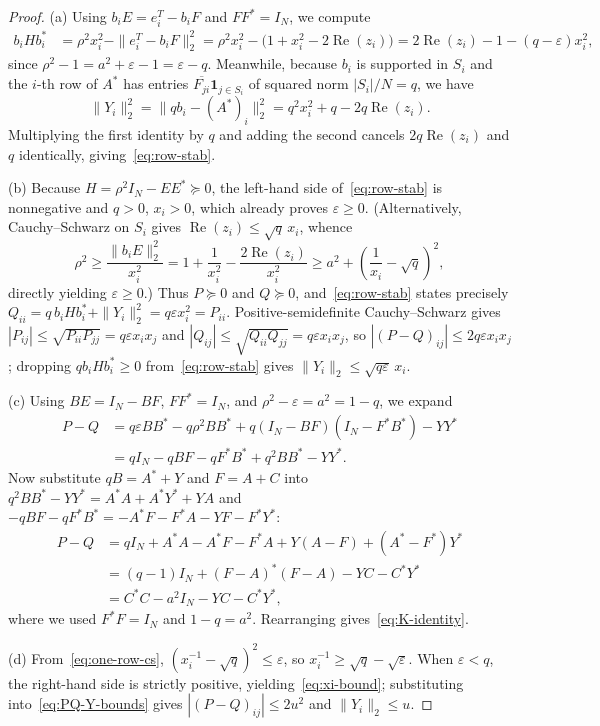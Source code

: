 \documentclass[11pt,reqno]{amsart}
\numberwithin{equation}{section}
\theoremstyle{definition}
\theoremstyle{remark}
\begin{document}
\begin{proof}
(a) Using $b_i E = e_i^T - b_i F$ and $FF^*=I_N$, we compute
\begin{align*}
b_i H b_i^*
&= \rho^2 x_i^2 - \|e_i^T - b_i F\|_2^2
= \rho^2 x_i^2 - \bigl(1 + x_i^2 - 2\operatorname{Re}(z_i)\bigr)
= 2\operatorname{Re}(z_i) - 1 - (q - \varepsilon)x_i^2,
\end{align*}
since $\rho^2 - 1 = a^2 + \varepsilon - 1 = \varepsilon - q$. Meanwhile, because $b_i$ is supported in $S_i$ and the $i$-th row of $A^*$ has entries $\overline{F_{ji}}\mathbf{1}_{j\in S_i}$ of squared norm $|S_i|/N = q$, we have
\[
\|Y_i\|_2^2 = \|q b_i - (A^*)_i\|_2^2 = q^2 x_i^2 + q - 2q\operatorname{Re}(z_i).
\]
Multiplying the first identity by $q$ and adding the second cancels $2q\operatorname{Re}(z_i)$ and $q$ identically, giving~\eqref{eq:row-stab}.

(b) Because $H=\rho^2 I_N - EE^* \succeq 0$, the left-hand side of~\eqref{eq:row-stab} is nonnegative and $q>0$, $x_i>0$, which already proves $\varepsilon\ge 0$. (Alternatively, Cauchy--Schwarz on $S_i$ gives $\operatorname{Re}(z_i)\le \sqrt{q}\,x_i$, whence
\begin{equation}
\label{eq:one-row-cs}
\rho^2 \ge \frac{\|b_i E\|_2^2}{x_i^2}
= 1 + \frac{1}{x_i^2} - \frac{2\operatorname{Re}(z_i)}{x_i^2}
\ge a^2 + \left(\frac{1}{x_i} - \sqrt{q}\right)^2,
\end{equation}
directly yielding $\varepsilon\ge 0$.) Thus $P\succeq 0$ and $Q\succeq 0$, and~\eqref{eq:row-stab} states precisely $Q_{ii} = q\,b_i H b_i^* + \|Y_i\|_2^2 = q\varepsilon x_i^2 = P_{ii}$. Positive-semidefinite Cauchy--Schwarz gives $|P_{ij}|\le\sqrt{P_{ii}P_{jj}}=q\varepsilon x_i x_j$ and $|Q_{ij}|\le\sqrt{Q_{ii}Q_{jj}}=q\varepsilon x_i x_j$, so $|(P-Q)_{ij}|\le 2q\varepsilon x_i x_j$; dropping $q b_i H b_i^*\ge 0$ from~\eqref{eq:row-stab} gives $\|Y_i\|_2\le\sqrt{q\varepsilon}\,x_i$.

(c) Using $BE=I_N-BF$, $FF^*=I_N$, and $\rho^2-\varepsilon = a^2 = 1-q$, we expand
\begin{align*}
P - Q
&= q\varepsilon BB^* - q\rho^2 BB^* + q(I_N - BF)(I_N - F^*B^*) - YY^* \\
&= qI_N - qBF - qF^*B^* + q^2 BB^* - YY^*.
\end{align*}
Now substitute $qB = A^* + Y$ and $F = A + C$ into $q^2 BB^* - YY^* = A^*A + A^*Y^* + YA$ and $-qBF - qF^*B^* = -A^*F - F^*A - YF - F^*Y^*$:
\begin{align*}
P - Q
&= qI_N + A^*A - A^*F - F^*A + Y(A - F) + (A^* - F^*)Y^* \\
&= (q - 1)I_N + (F - A)^*(F - A) - YC - C^*Y^* \\
&= C^*C - a^2 I_N - YC - C^*Y^*,
\end{align*}
where we used $F^*F = I_N$ and $1-q = a^2$. Rearranging gives~\eqref{eq:K-identity}.

(d) From~\eqref{eq:one-row-cs}, $(x_i^{-1}-\sqrt{q})^2 \le \varepsilon$, so $x_i^{-1}\ge \sqrt{q}-\sqrt{\varepsilon}$. When $\varepsilon<q$, the right-hand side is strictly positive, yielding~\eqref{eq:xi-bound}; substituting into~\eqref{eq:PQ-Y-bounds} gives $|(P-Q)_{ij}|\le 2u^2$ and $\|Y_i\|_2\le u$.
\end{proof}
\end{document}
